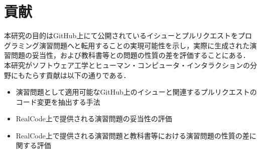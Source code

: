 \section{貢献}
本研究の目的はGitHub上にて公開されているイシューとプルリクエストをプログラミング演習問題へと転用することの実現可能性を示し，実際に生成された演習問題の妥当性，および教科書等との問題の性質の差を評価することにある．
本研究がソフトウェア工学とヒューマン・コンピュータ・インタラクションの分野にもたらす貢献は以下の通りである．

\begin{itemize}
\item 演習問題として適用可能なGitHub上のイシューと関連するプルリクエストのコード変更を抽出する手法
\item RealCode上で提供される演習問題の妥当性の評価
\item RealCode上で提供される演習問題と教科書等における演習問題の性質の差に関する評価
\end{itemize}